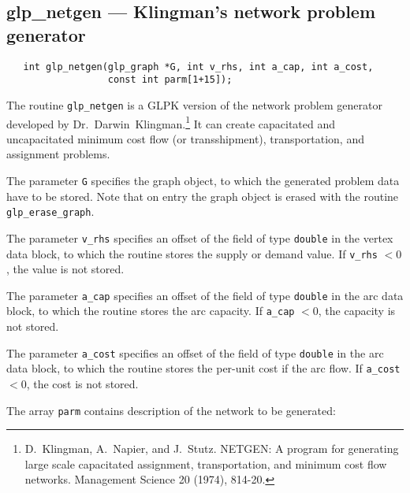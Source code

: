 \documentclass[11pt]{report}
\def\para#1{\noindent{\bf#1}}
\def\synopsis{\para{Synopsis}}
\def\description{\para{Description}}
\begin{document}
\subsection{glp\_netgen --- Klingman's network problem generator}

\synopsis

\begin{verbatim}
   int glp_netgen(glp_graph *G, int v_rhs, int a_cap, int a_cost,
                  const int parm[1+15]);
\end{verbatim}

\description

The routine \verb|glp_netgen| is a GLPK version of the network problem
generator developed by Dr.~Darwin~Klingman.\footnote{D.~Klingman,
A.~Napier, and J.~Stutz. NETGEN: A program for generating large scale
capacitated assignment, transportation, and minimum cost flow networks.
Management Science 20 (1974), 814-20.} It can create capacitated and
uncapacitated minimum cost flow (or transshipment), transportation, and
assignment problems.

The parameter \verb|G| specifies the graph object, to which the
generated  problem data have to be stored. Note that on entry the graph
object  is erased with the routine \verb|glp_erase_graph|.

The parameter \verb|v_rhs| specifies an offset of the field of type
\verb|double| in the vertex data block, to which the routine stores the
supply or  demand value. If \verb|v_rhs| $<0$, the value is not stored.

The parameter \verb|a_cap| specifies an offset of the field of type
\verb|double| in the arc data block, to which the routine stores the
arc capacity. If \verb|a_cap| $<0$, the capacity is not stored.

\newpage

The parameter \verb|a_cost| specifies an offset of the field of type
\verb|double| in the arc data block, to which the routine stores the
per-unit cost if the arc flow. If \verb|a_cost| $<0$, the cost is not
stored.

The array \verb|parm| contains description of the network to be
generated:
\end{document}
